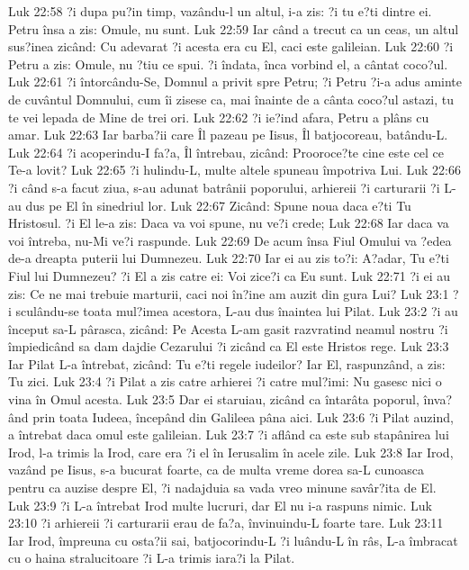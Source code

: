 Luk 22:58  ?i dupa pu?in timp, vazându-l un altul, i-a zis: ?i tu e?ti dintre ei. Petru însa a zis: Omule, nu sunt.
Luk 22:59  Iar când a trecut ca un ceas, un altul sus?inea zicând: Cu adevarat ?i acesta era cu El, caci este galileian.
Luk 22:60  ?i Petru a zis: Omule, nu ?tiu ce spui. ?i îndata, înca vorbind el, a cântat coco?ul.
Luk 22:61  ?i întorcându-Se, Domnul a privit spre Petru; ?i Petru ?i-a adus aminte de cuvântul Domnului, cum îi zisese ca, mai înainte de a cânta coco?ul astazi, tu te vei lepada de Mine de trei ori.
Luk 22:62  ?i ie?ind afara, Petru a plâns cu amar.
Luk 22:63  Iar barba?ii care Îl pazeau pe Iisus, Îl batjocoreau, batându-L.
Luk 22:64  ?i acoperindu-I fa?a, Îl întrebau, zicând: Prooroce?te cine este cel ce Te-a lovit?
Luk 22:65  ?i hulindu-L, multe altele spuneau împotriva Lui.
Luk 22:66  ?i când s-a facut ziua, s-au adunat batrânii poporului, arhiereii ?i carturarii ?i L-au dus pe El în sinedriul lor.
Luk 22:67  Zicând: Spune noua daca e?ti Tu Hristosul. ?i El le-a zis: Daca va voi spune, nu ve?i crede;
Luk 22:68  Iar daca va voi întreba, nu-Mi ve?i raspunde.
Luk 22:69  De acum însa Fiul Omului va ?edea de-a dreapta puterii lui Dumnezeu.
Luk 22:70  Iar ei au zis to?i: A?adar, Tu e?ti Fiul lui Dumnezeu? ?i El a zis catre ei: Voi zice?i ca Eu sunt.
Luk 22:71  ?i ei au zis: Ce ne mai trebuie marturii, caci noi în?ine am auzit din gura Lui?
Luk 23:1  ?i sculându-se toata mul?imea acestora, L-au dus înaintea lui Pilat.
Luk 23:2  ?i au început sa-L pârasca, zicând: Pe Acesta L-am gasit razvratind neamul nostru ?i împiedicând sa dam dajdie Cezarului ?i zicând ca El este Hristos rege.
Luk 23:3  Iar Pilat L-a întrebat, zicând: Tu e?ti regele iudeilor? Iar El, raspunzând, a zis: Tu zici.
Luk 23:4  ?i Pilat a zis catre arhierei ?i catre mul?imi: Nu gasesc nici o vina în Omul acesta.
Luk 23:5  Dar ei staruiau, zicând ca întarâta poporul, înva?ând prin toata Iudeea, începând din Galileea pâna aici.
Luk 23:6  ?i Pilat auzind, a întrebat daca omul este galileian.
Luk 23:7  ?i aflând ca este sub stapânirea lui Irod, l-a trimis la Irod, care era ?i el în Ierusalim în acele zile.
Luk 23:8  Iar Irod, vazând pe Iisus, s-a bucurat foarte, ca de multa vreme dorea sa-L cunoasca pentru ca auzise despre El, ?i nadajduia sa vada vreo minune savâr?ita de El.
Luk 23:9  ?i L-a întrebat Irod multe lucruri, dar El nu i-a raspuns nimic.
Luk 23:10  ?i arhiereii ?i carturarii erau de fa?a, învinuindu-L foarte tare.
Luk 23:11  Iar Irod, împreuna cu osta?ii sai, batjocorindu-L ?i luându-L în râs, L-a îmbracat cu o haina stralucitoare ?i L-a trimis iara?i la Pilat.
